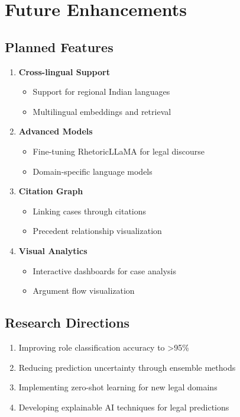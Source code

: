 \documentclass[12pt,a4paper]{article}
\begin{document}
\section{Future Enhancements}

\subsection{Planned Features}

\begin{enumerate}
    \item \textbf{Cross-lingual Support}
    \begin{itemize}
        \item Support for regional Indian languages
        \item Multilingual embeddings and retrieval
    \end{itemize}
    
    \item \textbf{Advanced Models}
    \begin{itemize}
        \item Fine-tuning RhetoricLLaMA for legal discourse
        \item Domain-specific language models
    \end{itemize}
    
    \item \textbf{Citation Graph}
    \begin{itemize}
        \item Linking cases through citations
        \item Precedent relationship visualization
    \end{itemize}
    
    \item \textbf{Visual Analytics}
    \begin{itemize}
        \item Interactive dashboards for case analysis
        \item Argument flow visualization
    \end{itemize}
\end{enumerate}

\subsection{Research Directions}

\begin{enumerate}
    \item Improving role classification accuracy to >95\%
    \item Reducing prediction uncertainty through ensemble methods
    \item Implementing zero-shot learning for new legal domains
    \item Developing explainable AI techniques for legal predictions
\end{enumerate}
\end{document}
